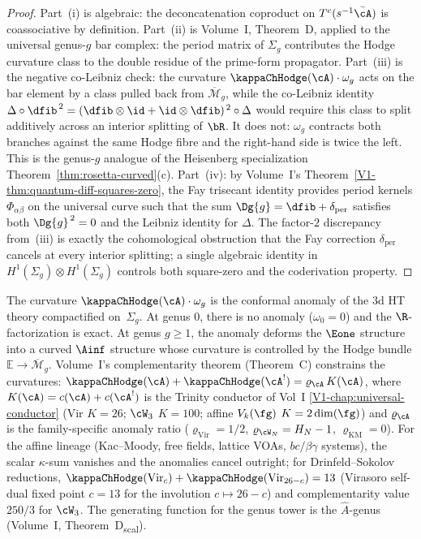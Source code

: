 \begin{proof}
Part~(i) is algebraic: the deconcatenation coproduct on
$T^c(s^{-1}\bar{\cA})$ is coassociative by definition.
Part~(ii) is Volume~I, Theorem~D, applied to the universal
genus-$g$ bar complex: the period matrix of $\Sigma_g$
contributes the Hodge curvature class to the double residue
of the prime-form propagator.
Part~(iii) is the negative co-Leibniz check: the curvature
$\kappaChHodge(\cA)\cdot\omega_g$ acts on the bar element by a class
pulled back from $\overline{\mathcal{M}}_g$, while the
co-Leibniz identity $\Delta\circ\dfib^{\,2} =
(\dfib\otimes\id+\id\otimes\dfib)^{\,2}\circ\Delta$ would
require this class to split additively across an interior
splitting of $\bR$. It does not: $\omega_g$ contracts both
branches against the same Hodge fibre and the right-hand side
is twice the left. This is the genus-$g$ analogue of the
Heisenberg specialization
Theorem~\ref{thm:rosetta-curved}\textup{(c)}.
Part~(iv): by Volume~I's
Theorem~\ref{V1-thm:quantum-diff-squares-zero}, the Fay
trisecant identity provides period kernels
$\Phi_{\alpha\beta}$ on the universal curve such that the
sum $\Dg{g} = \dfib + \delta_{\mathrm{per}}$ satisfies both
$\Dg{g}^{\,2} = 0$ and the Leibniz identity for $\Delta$. The
factor-$2$ discrepancy from~(iii) is exactly the cohomological
obstruction that the Fay correction $\delta_{\mathrm{per}}$
cancels at every interior splitting; a single algebraic
identity in $H^{1}(\Sigma_g)\otimes H^{1}(\Sigma_g)$ controls
both square-zero and the coderivation property.
\end{proof}

\begin{remark}
The curvature $\kappaChHodge(\cA) \cdot \omega_g$ is the conformal
anomaly of the 3d HT theory compactified on~$\Sigma_g$. At genus
$0$, there is no anomaly ($\omega_0 = 0$) and the
$\R$-factorization is exact. At genus $g \geq 1$, the anomaly
deforms the $\Eone$ structure into a curved $\Ainf$ structure
whose curvature is controlled by the Hodge bundle
$\mathbb{E} \to \overline{\mathcal{M}}_g$. Volume~I's
complementarity theorem (Theorem~C) constrains the curvatures:
$\kappaChHodge(\cA) + \kappaChHodge(\cA^!) = \varrho_\cA \, K(\cA)$, where
$K(\cA) = c(\cA) + c(\cA^!)$ is the Trinity conductor of
Vol~I \cref{V1-chap:universal-conductor} (Vir $K = 26$;
$\cW_3$ $K = 100$; affine $V_k(\fg)$ $K = 2\dim(\fg)$) and
$\varrho_\cA$ is the family-specific anomaly ratio
($\varrho_{\mathrm{Vir}} = 1/2$, $\varrho_{\cW_N} = H_N - 1$,
$\varrho_{\mathrm{KM}} = 0$). For the affine lineage (Kac--Moody,
free fields, lattice VOAs, $bc/\beta\gamma$ systems), the scalar
$\kappa$-sum vanishes and the anomalies cancel outright; for
Drinfeld--Sokolov reductions,
$\kappaChHodge(\mathrm{Vir}_c) + \kappaChHodge(\mathrm{Vir}_{26-c}) = 13$
(Virasoro self-dual fixed point $c = 13$ for the involution
$c \mapsto 26 - c$) and complementarity value $250/3$ for $\cW_3$.
The
generating function for the genus tower is
the $\hat{A}$-genus (Volume~I, Theorem~D\textsubscript{scal}).
\end{remark}

